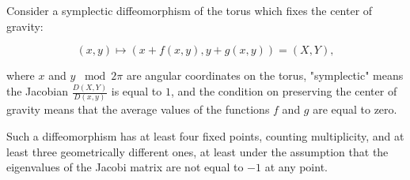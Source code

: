 Consider a symplectic diffeomorphism of the torus which fixes the center of gravity:

$$(x, y) \mapsto (x + f(x, y), y + g(x, y)) = (X, Y),$$

where $x$ and $y$ $\bmod 2\pi$ are angular coordinates on the torus, "symplectic" means the Jacobian $\frac{D(X,Y)}{D(x,y)}$ is equal to $1$, and the condition on preserving the center of gravity means that the average values of the functions $f$ and $g$ are equal to zero.

Such a diffeomorphism has at least four fixed points, counting multiplicity, and at least three geometrically different ones, at least under the assumption that the eigenvalues of the Jacobi matrix are not equal to $-1$ at any point.
